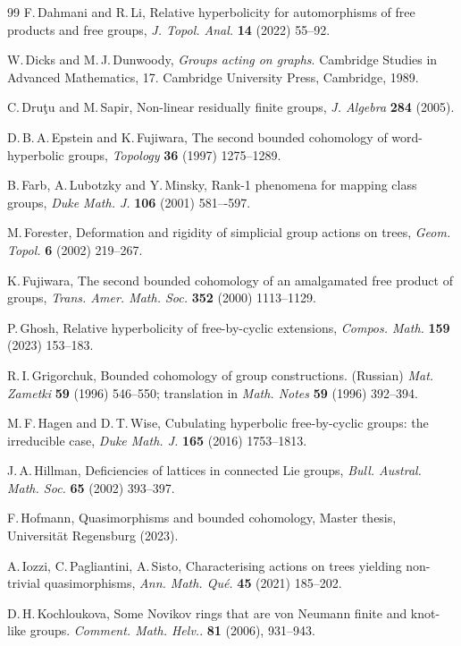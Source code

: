 \documentclass[11pt,reqno]{amsart}
\numberwithin{equation}{section}
\theoremstyle{definition}
\theoremstyle{remark}
\begin{document}
\begin{thebibliography}{99}
 F.\,Dahmani and R.\,Li,
  Relative hyperbolicity for automorphisms of free products and free groups,
  {\it J. Topol. Anal.} {\bf 14} (2022) 55--92. 
  
  W.\,Dicks and M.\,J.\,Dunwoody,
  {\it Groups acting on graphs}. Cambridge Studies in Advanced Mathematics, 17.
  Cambridge University Press, Cambridge, 1989.


 C.\,Dru\c tu and M.\,Sapir,
Non-linear residually finite groups,
{\it J. Algebra} {\bf 284} (2005).
  
 D.\,B.\,A.\,Epstein and K.\,Fujiwara,
The second bounded cohomology of word-hyperbolic groups,
  {\it Topology} {\bf 36} (1997) 1275--1289.


 B.\,Farb, A.\,Lubotzky and Y.\,Minsky,
Rank-1 phenomena for mapping class groups,
{\it Duke Math. J.} {\bf 106} (2001) 581–-597.

 M.\,Forester,
Deformation and rigidity of simplicial group actions on trees,
 {\it Geom. Topol.} {\bf 6} (2002) 219--267.

 
 K.\,Fujiwara,
The second bounded cohomology of an amalgamated free product of groups,
{\it Trans. Amer. Math. Soc.} {\bf 352} (2000) 1113--1129. 

 P.\,Ghosh,
  Relative hyperbolicity of free-by-cyclic extensions,
  {\it Compos. Math.} {\bf 159} (2023) 153--183.


 R.\,I.\,Grigorchuk,
Bounded cohomology of group constructions. (Russian)
{\it Mat. Zametki} {\bf 59} (1996) 546--550; translation in
{\it Math. Notes} {\bf 59} (1996) 392--394. 


 M.\,F.\,Hagen and D.\,T.\,Wise,
Cubulating hyperbolic free-by-cyclic groups:
the irreducible case,
{\it Duke Math. J.} {\bf 165} (2016) 1753--1813.


 J.\,A.\,Hillman,
  Deficiencies of lattices in connected Lie groups,
  {\it Bull. Austral. Math. Soc.} {\bf 65} (2002) 393--397.


 F.\,Hofmann,
  Quasimorphisms and bounded cohomology,
  Master thesis, Universit\"at Regensburg (2023).
  
 A.\,Iozzi, C.\,Pagliantini, A.\,Sisto,
  Characterising actions on trees yielding non-trivial quasimorphisms,
  {\it Ann. Math. Qué.} {\bf 45} (2021) 185--202.
  
 D.\,H.\,Kochloukova,
Some Novikov rings that are von Neumann finite and knot-like groups.
{\it Comment. Math. Helv.}. {\bf 81} (2006), 931--943.


\end{thebibliography}
\end{document}
